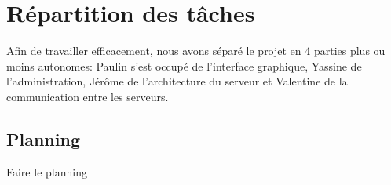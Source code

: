\section{Répartition des tâches}

\par Afin de travailler efficacement, nous avons séparé le projet en 4 parties plus ou moins autonomes: Paulin s'est occupé de l'interface graphique, Yassine de l'administration, Jérôme de l'architecture du serveur et Valentine de la communication entre les serveurs.

\subsection{Planning}

Faire le planning
